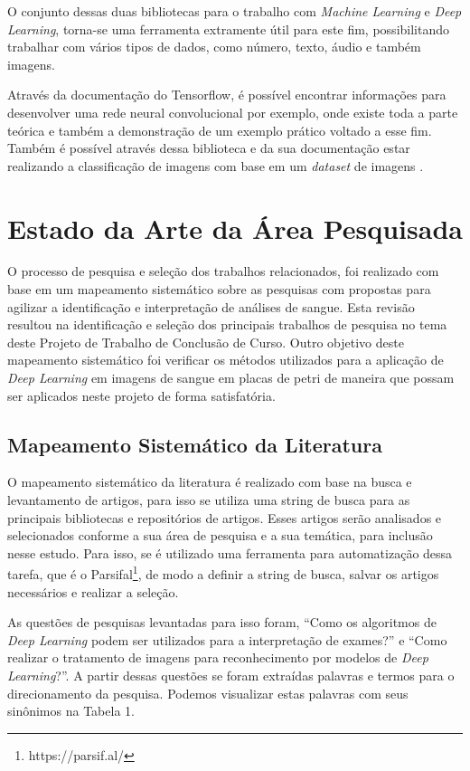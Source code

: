 O conjunto dessas duas bibliotecas para o trabalho com \emph{Machine Learning} e \emph{Deep Learning}, torna-se uma ferramenta extramente útil para este fim, possibilitando trabalhar com vários tipos de dados, como número, texto, áudio e também imagens.

Através da documentação do Tensorflow, é possível encontrar informações para desenvolver uma rede neural convolucional por exemplo, onde existe toda a parte teórica e também a demonstração de um exemplo prático voltado a esse fim. Também é possível através dessa biblioteca e da sua documentação estar realizando a classificação de imagens com base em um \emph{dataset} de imagens \cite{websiteTensorFlow}.

\chapter{Estado da Arte da Área Pesquisada}
\label{chap:mapeamento}

O processo de pesquisa e seleção dos trabalhos relacionados, foi realizado com base em um mapeamento sistemático sobre as pesquisas com propostas para agilizar a identificação e interpretação de análises de sangue. Esta revisão resultou na identificação e seleção dos principais trabalhos de pesquisa no tema deste Projeto de Trabalho de Conclusão de Curso. Outro objetivo deste mapeamento sistemático foi verificar os métodos utilizados para a aplicação de \emph{Deep Learning} em imagens de sangue em placas de petri de maneira que possam ser aplicados neste projeto de forma satisfatória.

\section{Mapeamento Sistemático da Literatura}

O mapeamento sistemático da literatura é realizado com base na busca e levantamento de artigos, para isso se utiliza uma string de busca para as principais bibliotecas e repositórios de artigos. Esses artigos serão analisados e selecionados conforme a sua área de pesquisa e a sua temática, para inclusão nesse estudo. Para isso, se é utilizado uma ferramenta para automatização dessa tarefa, que é o Parsifal\footnote[1]{https://parsif.al/}, de modo a definir a string de busca, salvar os artigos necessários e realizar a seleção.

As questões de pesquisas levantadas para isso foram, ``Como os algoritmos de \emph{Deep Learning} podem ser utilizados para a interpretação de exames?'' e ``Como realizar o tratamento de imagens para reconhecimento por modelos de \emph{Deep Learning}?''. A partir dessas questões se foram extraídas palavras e termos para o direcionamento da pesquisa. Podemos visualizar estas palavras com seus sinônimos na Tabela 1.

